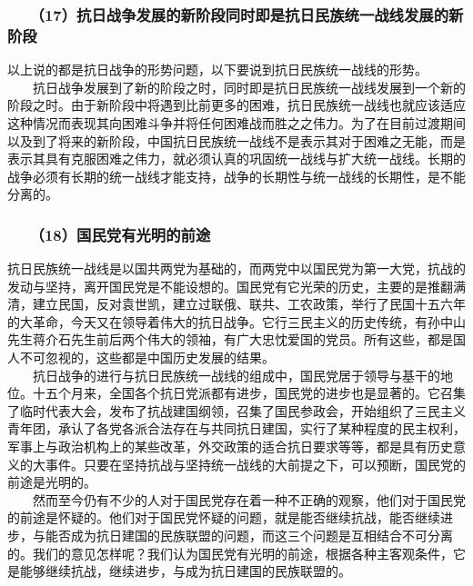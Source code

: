 \documentclass[cn,11pt,chinese]{elegantbook}
\def\myformat#1{\hfil\hfil #1}
\begin{document}
\subsubsection*{\myformat{　　（17）抗日战争发展的新阶段同时即是抗日民族统一战线发展的新阶段}}
以上说的都是抗日战争的形势问题，以下要说到抗日民族统一战线的形势。\\
　　抗日战争发展到了新的阶段之时，同时即是抗日民族统一战线发展到一个新的阶段之时。由于新阶段中将遇到比前更多的困难，抗日民族统一战线也就应该适应这种情况而表现其向困难斗争并将任何困难战而胜之之伟力。为了在目前过渡期间以及到了将来的新阶段，中国抗日民族统一战线不是表示其对于困难之无能，而是表示其具有克服困难之伟力，就必须认真的巩固统一战线与扩大统一战线。长期的战争必须有长期的统一战线才能支持，战争的长期性与统一战线的长期性，是不能分离的。\\
\subsubsection*{\myformat{　　（18）国民党有光明的前途}}
抗日民族统一战线是以国共两党为基础的，而两党中以国民党为第一大党，抗战的发动与坚持，离开国民党是不能设想的。国民党有它光荣的历史，主要的是推翻满清，建立民国，反对袁世凯，建立过联俄、联共、工农政策，举行了民国十五六年的大革命，今天又在领导着伟大的抗日战争。它行三民主义的历史传统，有孙中山先生蒋介石先生前后两个伟大的领袖，有广大忠忱爱国的党员。所有这些，都是国人不可忽视的，这些都是中国历史发展的结果。\\
　　抗日战争的进行与抗日民族统一战线的组成中，国民党居于领导与基干的地位。十五个月来，全国各个抗日党派都有进步，国民党的进步也是显著的。它召集了临时代表大会，发布了抗战建国纲领，召集了国民参政会，开始组织了三民主义青年团，承认了各党各派合法存在与共同抗日建国，实行了某种程度的民主权利，军事上与政治机构上的某些改革，外交政策的适合抗日要求等等，都是具有历史意义的大事件。只要在坚持抗战与坚持统一战线的大前提之下，可以预断，国民党的前途是光明的。\\
　　然而至今仍有不少的人对于国民党存在着一种不正确的观察，他们对于国民党的前途是怀疑的。他们对于国民党怀疑的问题，就是能否继续抗战，能否继续进步，与能否成为抗日建国的民族联盟的问题，而这三个问题是互相结合不可分离的。我们的意见怎样呢？我们认为国民党有光明的前途，根据各种主客观条件，它是能够继续抗战，继续进步，与成为抗日建国的民族联盟的。\\
\end{document}
